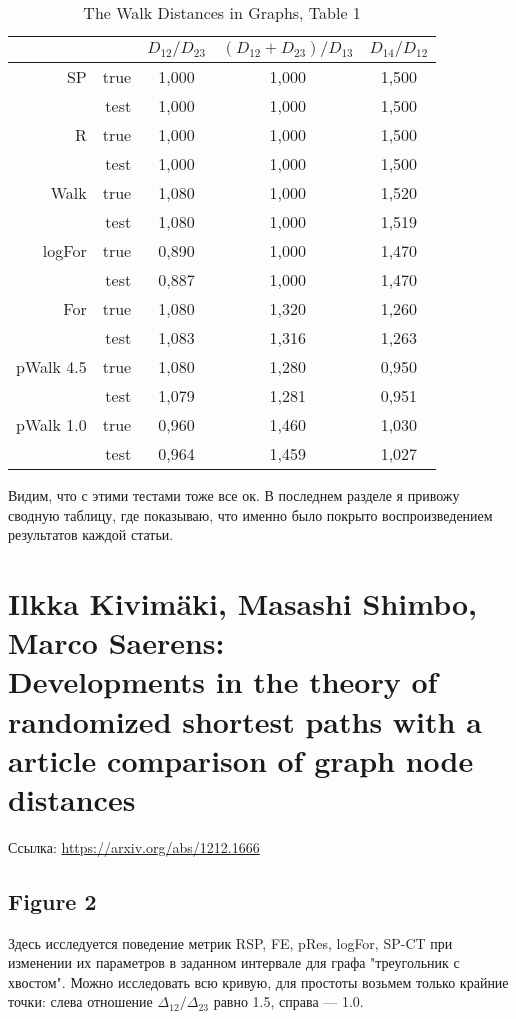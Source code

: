 \documentclass{article}
\begin{document}
\begin{table}[H]
\centering
\caption{The Walk Distances in Graphs, Table 1}
\label{my-label}
\begin{tabular}{rr|ccc}
          &      & $D_{12} / D_{23}$ & $(D_{12}+D_{23}) / D_{13}$ & $D_{14} / D_{12}$ \\
          \hline
SP        & true & 1,000 & 1,000 & 1,500 \\
          & test & 1,000 & 1,000 & 1,500 \\
          \hline
R         & true & 1,000 & 1,000 & 1,500 \\
          & test & 1,000 & 1,000 & 1,500 \\
          \hline
Walk      & true & 1,080 & 1,000 & 1,520 \\
          & test & 1,080 & 1,000 & 1,519 \\
          \hline
logFor    & true & 0,890 & 1,000 & 1,470 \\
          & test & 0,887 & 1,000 & 1,470 \\
          \hline
For       & true & 1,080 & 1,320 & 1,260 \\
          & test & 1,083 & 1,316 & 1,263 \\
          \hline
pWalk 4.5 & true & 1,080 & 1,280 & 0,950 \\
          & test & 1,079 & 1,281 & 0,951 \\
          \hline
pWalk 1.0 & true & 0,960 & 1,460 & 1,030 \\
          & test & 0,964 & 1,459 & 1,027 
\end{tabular}
\end{table}

Видим, что с этими тестами тоже все ок. В последнем разделе я привожу сводную таблицу, где показываю, что именно было покрыто воспроизведением результатов каждой статьи.


\section{Ilkka Kivim{\"a}ki, Masashi Shimbo, Marco Saerens:\\
         Developments in the theory of randomized shortest paths with a article comparison of graph node distances}
Ссылка: \url{https://arxiv.org/abs/1212.1666}

\subsection{Figure 2}
Здесь исследуется поведение метрик RSP, FE, pRes, logFor, SP-CT при изменении их параметров в заданном интервале для графа "треугольник с хвостом". Можно исследовать всю кривую, для простоты возьмем только крайние точки: слева отношение $\Delta_{12}/\Delta_{23}$ равно 1.5, справа --- 1.0.
\end{document}
